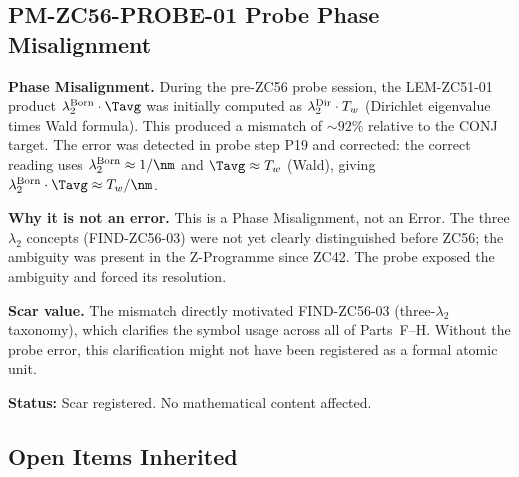 \documentclass[12pt, a4paper]{article}
\begin{document}
\subsection{PM-ZC56-PROBE-01 \quad Probe Phase Misalignment}


\begin{openqbox}[title={PM-ZC56-PROBE-01: Probe Misread
  LEM-ZC51-01 ($\lambda_2\cdot T_w$ vs $\lambda_2\cdot\Tavg$)
  (Style Scar)}]
\textbf{Phase Misalignment.}
During the pre-ZC56 probe session, the LEM-ZC51-01 product
$\lambda_2^{\rm Born}\cdot\Tavg$ was initially computed as
$\lambda_2^{\rm Dir}\cdot T_w$ (Dirichlet eigenvalue times Wald
formula).  This produced a mismatch of $\sim92\%$ relative to
the CONJ target.  The error was detected in probe step P19 and
corrected: the correct reading uses $\lambda_2^{\rm Born}
\approx1/\nm$ and $\Tavg\approx T_w$ (Wald), giving
$\lambda_2^{\rm Born}\cdot\Tavg\approx T_w/\nm$.

\textbf{Why it is not an error.}
This is a Phase Misalignment, not an Error.
The three $\lambda_2$ concepts (FIND-ZC56-03) were not yet
clearly distinguished before ZC56; the ambiguity was present
in the Z-Programme since ZC42.  The probe exposed the
ambiguity and forced its resolution.

\textbf{Scar value.}
The mismatch directly motivated FIND-ZC56-03 (three-$\lambda_2$
taxonomy), which clarifies the symbol usage across all of
Parts~F--H.  Without the probe error, this clarification might
not have been registered as a formal atomic unit.

\textbf{Status:} Scar registered.  No mathematical content affected.
\end{openqbox}

\subsection{Open Items Inherited}
\end{document}
